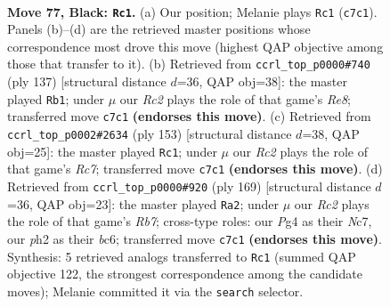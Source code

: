 \documentclass[11pt]{article}
\begin{document}
\clearpage

\begin{figure}[p]\centering
\begin{subfigure}{0.46\textwidth}\centering
\resizebox{\linewidth}{!}{%
\newchessgame
\chessboard[
  setfen={B7/2r2p2/n5p1/4P2p/b4Pp1/3k2N1/5K1P/8 b - - 13 77},
  showmover=false,
  pgfstyle=straightmove, color=movearrow, markmove={c7-c1}
]}
\caption{}
\end{subfigure}\hfill
\begin{subfigure}{0.46\textwidth}\centering
\resizebox{\linewidth}{!}{%
\newchessgame
\chessboard[
  setfen={8/5pk1/1pB3p1/7p/P4N1P/6P1/7K/4r3 b - - 2 69},
  showmover=false,
  pgfstyle=straightmove, color=movearrow, markmove={e1-b1}
]}
\caption{}
\end{subfigure}
\\[4pt]
\begin{subfigure}{0.46\textwidth}\centering
\resizebox{\linewidth}{!}{%
\newchessgame
\chessboard[
  setfen={8/8/6kp/6p1/4Np2/5P1P/2r3P1/4B1K1 b - - 57 77},
  showmover=false,
  pgfstyle=straightmove, color=movearrow, markmove={c2-c1}
]}
\caption{}
\end{subfigure}\hfill
\begin{subfigure}{0.46\textwidth}\centering
\resizebox{\linewidth}{!}{%
\newchessgame
\chessboard[
  setfen={8/2nN2k1/2B2pp1/7p/7P/3KB1P1/1r6/8 b - - 37 85},
  showmover=false,
  pgfstyle=straightmove, color=movearrow, markmove={b2-a2}
]}
\caption{}
\end{subfigure}
\caption{\textbf{Move 77, Black: \texttt{Rc1}.} (a) Our position; Melanie plays \texttt{Rc1} (\texttt{c7c1}). Panels (b)--(d) are the retrieved master positions whose correspondence most drove this move (highest QAP objective among those that transfer to it). (b) Retrieved from \texttt{ccrl\_top\_p0000\#740} (ply 137) [structural distance $d$=36, QAP obj=38]: the master played \texttt{Rb1}; under $\mu$ our \emph{Rc2} plays the role of that game's \emph{Re8}; transferred move \texttt{c7c1} \textbf{(endorses this move)}. (c) Retrieved from \texttt{ccrl\_top\_p0002\#2634} (ply 153) [structural distance $d$=38, QAP obj=25]: the master played \texttt{Rc1}; under $\mu$ our \emph{Rc2} plays the role of that game's \emph{Rc7}; transferred move \texttt{c7c1} \textbf{(endorses this move)}. (d) Retrieved from \texttt{ccrl\_top\_p0000\#920} (ply 169) [structural distance $d$=36, QAP obj=23]: the master played \texttt{Ra2}; under $\mu$ our \emph{Rc2} plays the role of that game's \emph{Rb7}; cross-type roles: our \emph{P}g4 as their \emph{N}c7, our \emph{p}h2 as their \emph{b}c6; transferred move \texttt{c7c1} \textbf{(endorses this move)}. Synthesis: 5 retrieved analogs transferred to \texttt{Rc1} (summed QAP objective 122, the strongest correspondence among the candidate moves); Melanie committed it via the \texttt{search} selector.}
\label{fig:thought-m153}
\end{figure}
\end{document}
